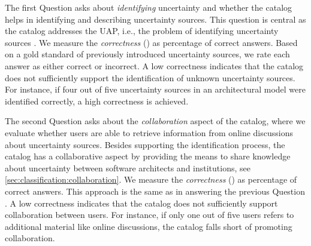 \label{gqm:text:q:4:1}
The first Question  asks about \emph{identifying} uncertainty and whether the catalog helps in identifying and describing uncertainty sources.
This question is central as the catalog addresses the \acf{UAP}, i.e., the problem of identifying uncertainty sources \cite{hahner_arcn_2024}.
We measure the \emph{correctness} (\label{gqm:text:m:4:1:1}) as percentage of correct answers.
Based on a gold standard of previously introduced uncertainty sources, we rate each answer as either correct or incorrect.
A low correctness indicates that the catalog does not sufficiently support the identification of unknown uncertainty sources.
For instance, if four out of five uncertainty sources in an architectural model were identified correctly, a high correctness is achieved.

\label{gqm:text:q:4:2}
The second Question  asks about the \emph{collaboration} aspect of the catalog, where we evaluate whether users are able to retrieve information from online discussions about uncertainty sources.
Besides supporting the identification process, the catalog has a collaborative aspect by providing the means to share knowledge about uncertainty between software architects and institutions, see \autoref{sec:classification:collaboration}.
We measure the \emph{correctness} (\label{gqm:text:m:4:2:1}) as percentage of correct answers.
This approach is the same as in answering the previous Question .
A low correctness indicates that the catalog does not sufficiently support collaboration between users.
For instance, if only one out of five users refers to additional material like online discussions, the catalog falls short of promoting collaboration.

